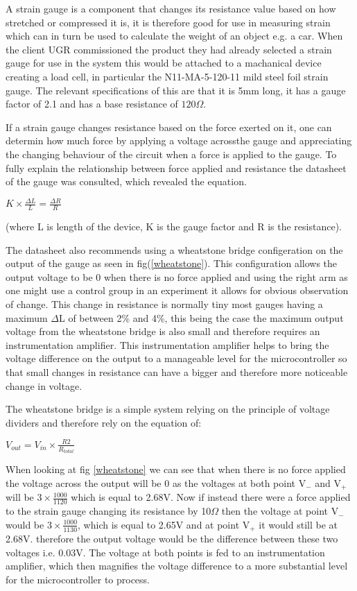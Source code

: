 A strain gauge is a component that changes its resistance value based on how stretched or compressed it is, it is therefore good for use in measuring strain which can in turn be used to calculate the weight of an object e.g. a car. When the client UGR commissioned the product they had already selected a strain gauge for use in the system this would be attached to a machanical device creating a load cell, in particular the N11-MA-5-120-11 mild steel foil strain gauge. The relevant specifications of this are that it is 5mm long, it has a gauge factor of 2.1 and has a base resistance of \(120\Omega\).

If a strain gauge changes resistance based on the force exerted on it, one can determin how much force by applying a voltage acrossthe gauge and appreciating the changing behaviour of the circuit when a force is applied to the gauge. To fully explain the relationship between force applied and resistance the datasheet of the gauge was consulted, which revealed the equation.


\centerline{\(K \times \frac{\Delta L}{L} = \frac{\Delta R}{R}\)}

 (where L is length of the device, K is the gauge factor and R is the resistance).  

The datasheet also recommends using a wheatstone bridge configeration on the output of the gauge as seen in fig(\ref{wheatstone}). This configuration allows the output voltage to be 0 when there is no force applied and using the right arm as one might use a control group in an experiment it allows for obvious observation of change. This change in resistance is normally tiny most gauges having a maximum \(\Delta\)L of between 2\% and 4\%, this being the case the maximum output voltage from the wheatstone bridge is also small and therefore requires an instrumentation amplifier. This instrumentation amplifier helps to bring the voltage difference on the output to a manageable level for the microcontroller so that small changes in resistance can have a bigger and therefore more noticeable change in voltage. 

The wheatstone bridge is a simple system relying on the principle of voltage dividers and therefore rely on the equation of:

\centerline{\(V_{out} = V_{in} \times \frac{R2}{R_{total}}\)}

When looking at fig \ref{wheatstone} we can see that when there is no force applied the voltage across the output will be 0 as the voltages at both point V\(_-\) and V\(_+\) will be \(3 \times \frac{1000}{1120}\) which is equal to 2.68V. Now if instead there were a force applied to the strain gauge changing its resistance by 10\(\Omega\) then the voltage at point V\(_-\) would be \(3 \times \frac{1000}{1130}\), which is equal to 2.65V and at point V\(_+\) it would still be at 2.68V. therefore the output voltage would be the difference between these two voltages i.e. 0.03V. The voltage at both points is fed to an instrumentation amplifier, which then magnifies the voltage difference to a more substantial level for the microcontroller to process. 

